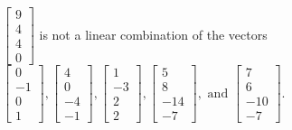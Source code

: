 \begin{exercise}
\begin{exerciseStatement}
  \end{exerciseStatement}
  \begin{exerciseAnswer}
   \(\left[\begin{array}{c}
9 \\
4 \\
4 \\
0
\end{array}\right]\) 
  	 is not  
	a linear combination of the vectors \(\left[\begin{array}{c}
0 \\
-1 \\
0 \\
1
\end{array}\right] , \left[\begin{array}{c}
4 \\
0 \\
-4 \\
-1
\end{array}\right] , \left[\begin{array}{c}
1 \\
-3 \\
2 \\
2
\end{array}\right] , \left[\begin{array}{c}
5 \\
8 \\
-14 \\
-7
\end{array}\right] , \text{ and } \left[\begin{array}{c}
7 \\
6 \\
-10 \\
-7
\end{array}\right]\).

	
  


  \end{exerciseAnswer}
\end{exercise}